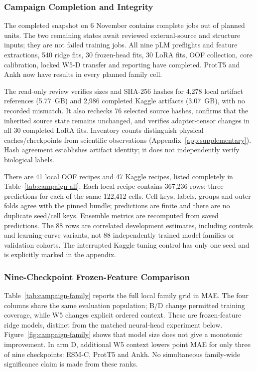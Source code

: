 \subsubsection{Campaign Completion and Integrity}\label{sec:campaign-results}
The completed snapshot on 6 November contains \nCampaignComplete{} complete jobs out of
\nCampaignTotal{} planned units. The two remaining states await reviewed external-source and
structure inputs; they are not failed training jobs. All nine pLM preflights and feature extractions,
540 ridge fits, 30 frozen-head fits, 30 LoRA fits, OOF collection, core calibration, locked W5-D
transfer and reporting have completed. ProtT5 and Ankh now have results in every planned family cell.

The read-only review verifies sizes and SHA-256 hashes for 4,278 local artifact references
(5.77~GB) and 2,986 completed Kaggle artifacts (3.07~GB), with no recorded mismatch. It also
rechecks 76 selected source hashes, confirms that the inherited source state remains unchanged,
and verifies adapter-tensor changes in all 30 completed LoRA fits. Inventory counts distinguish
physical caches/checkpoints from scientific observations (Appendix~\ref{app:supplementary}).
Hash agreement establishes artifact identity; it does not independently verify biological labels.

There are 41 local OOF recipes and 47 Kaggle recipes, listed completely in
Table~\ref{tab:campaign-all}. Each local recipe contains 367,236 rows: three predictions for each
of the same 122,412 cells. Cell keys, labels, groups and outer folds agree with the pinned bundle;
predictions are finite and there are no duplicate seed/cell keys. Ensemble metrics are recomputed
from saved predictions. The 88 rows are correlated development estimates, including controls and
learning-curve variants, not 88 independently trained model families or validation cohorts.
The interrupted Kaggle tuning control has only one seed and is explicitly marked in the appendix.

\subsubsection{Nine-Checkpoint Frozen-Feature Comparison}\label{sec:family-results}
Table~\ref{tab:campaign-family} reports the full local family grid in MAE. The four columns share
the same evaluation population; B/D change permitted training coverage, while W5 changes explicit
ordered context. These are frozen-feature ridge models, distinct from the matched neural-head
experiment below. Figure~\ref{fig:campaign-family} shows that model size does not give a monotonic
improvement. In arm D, additional W5 context lowers point MAE for only three of nine checkpoints:
ESM-C, ProtT5 and Ankh. No simultaneous family-wide significance claim is made from these ranks.

